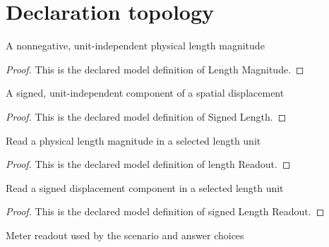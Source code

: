 \section{Declaration topology}
\begin{definition}
  \label{def:physics:phyx-mini-0650:phyxminiproblems-problemphyxmini0650-lengthmagnitude}
  A nonnegative, unit-independent physical length magnitude
\end{definition}
\begin{proof}
  This is the declared model definition of Length Magnitude.
\end{proof}
\begin{definition}
  \label{def:physics:phyx-mini-0650:phyxminiproblems-problemphyxmini0650-signedlength}
  A signed, unit-independent component of a spatial displacement
\end{definition}
\begin{proof}
  This is the declared model definition of Signed Length.
\end{proof}
\begin{definition}
  \label{def:physics:phyx-mini-0650:phyxminiproblems-problemphyxmini0650-lengthreadout}
  Read a physical length magnitude in a selected length unit
\end{definition}
\begin{proof}
  This is the declared model definition of length Readout.
\end{proof}
\begin{definition}
  \label{def:physics:phyx-mini-0650:phyxminiproblems-problemphyxmini0650-signedlengthreadout}
  Read a signed displacement component in a selected length unit
\end{definition}
\begin{proof}
  This is the declared model definition of signed Length Readout.
\end{proof}
\begin{definition}
  \label{def:physics:phyx-mini-0650:phyxminiproblems-problemphyxmini0650-lengthinmeters}
  Meter readout used by the scenario and answer choices
\end{definition}
